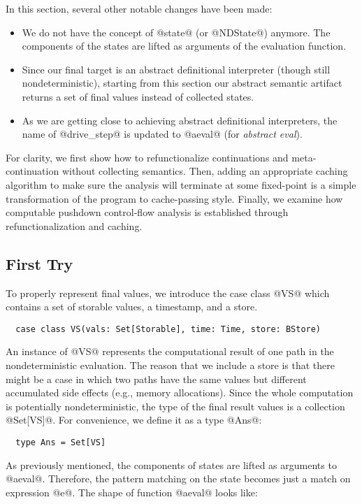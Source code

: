 \documentclass[acmsmall, review]{acmart}\settopmatter{}
\begin{document}
In this section, several other notable changes have been made:
\begin{itemize}
\item We do not have the concept of @state@ (or @NDState@) anymore.
The components of the states are lifted as arguments of the evaluation
function.
\item Since our final target is an abstract definitional interpreter (though still
nondeterministic), starting from this section our abstract semantic artifact
returns a set of final values instead of collected states.
\item As we are getting close to achieving
abstract definitional interpreters, the name of @drive_step@ is updated to
@aeval@ (for \emph{abstract eval}).
\end{itemize}

For clarity, we first show how to refunctionalize continuations and
meta-continuation without collecting semantics.
Then, adding an appropriate caching algorithm to make sure the analysis will
terminate at some fixed-point is a simple transformation of the program to cache-passing
style. Finally, we examine how computable pushdown control-flow analysis is established
through refunctionalization and caching.

\subsection{First Try}

To properly represent final values, we introduce the case class @VS@ which
contains a set of storable values, a timestamp, and a store.

\begin{lstlisting}
  case class VS(vals: Set[Storable], time: Time, store: BStore)
\end{lstlisting}

An instance of @VS@ represents the computational result of one path in
the nondeterministic evaluation.
The reason that we include a store is that there might be a case in which two paths
have the same values but different accumulated side effects (e.g., memory allocations).
Since the whole computation is potentially nondeterministic, the type of the final result
values is a collection @Set[VS]@. For convenience, we define it as a type @Ans@:

\begin{lstlisting}
  type Ans = Set[VS]
\end{lstlisting}

As previously mentioned, the components of states are lifted as arguments to
@aeval@. Therefore, the pattern matching on the state becomes just a match on
expression @e@. The shape of function @aeval@ looks like:
\end{document}
